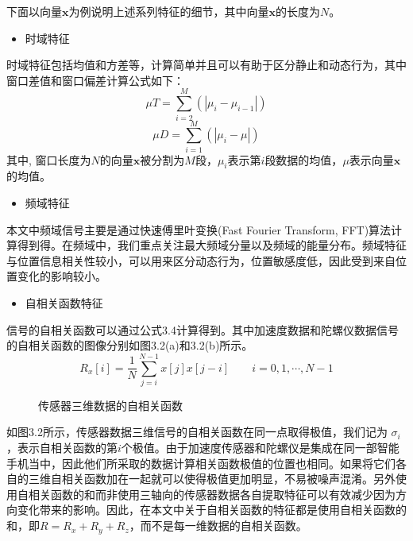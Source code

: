 下面以向量$\textbf{x}$为例说明上述系列特征的细节，其中向量$\textbf{x}$的长度为$N$。
\begin{itemize}
	\item 时域特征
\end{itemize}
\par 时域特征包括均值和方差等，计算简单并且可以有助于区分静止和动态行为，其中窗口差值和窗口偏差计算公式如下：
\begin{equation}
	\mu T = \sum_{i=2}^{M}(|\mu_i - \mu_{i-1}|)
\end{equation}
\begin{equation}
	\mu D = \sum_{i=1}^{M}(|\mu_i - \mu|)
\end{equation}
其中, 窗口长度为$N$的向量$\textbf{x}$被分割为$M$段，$\mu_i$表示第$i$段数据的均值，$\mu$表示向量$\textbf{x}$的均值。
\begin{itemize}
	\item 频域特征
\end{itemize}
\par 本文中频域信号主要是通过快速傅里叶变换(Fast Fourier Transform, FFT)算法计算得到得。在频域中，我们重点关注最大频域分量以及频域的能量分布。频域特征与位置信息相关性较小，可以用来区分动态行为，位置敏感度低，因此受到来自位置变化的影响较小。
\begin{itemize}
	\item 自相关函数特征
\end{itemize}
\par 信号的自相关函数可以通过公式3.4计算得到。其中加速度数据和陀螺仪数据信号的自相关函数的图像分别如图3.2(a)和3.2(b)所示。
\begin{equation}
	R_x[i]=\frac{1}{N}\sum_{j=i}^{N-1} x[j]x[j-i]\qquad  i=0, 1, \cdots, N-1
\end{equation}
\begin{figure}[!htb]
    \centering
    \caption{传感器三维数据的自相关函数}
\end{figure}

\par 如图3.2所示，传感器数据三维信号的自相关函数在同一点取得极值，我们记为 $\sigma_i$，表示自相关函数的第$i$个极值。由于加速度传感器和陀螺仪是集成在同一部智能手机当中，因此他们所采取的数据计算相关函数极值的位置也相同。如果将它们各自的三维自相关函数加在一起就可以使得极值更加明显，不易被噪声混淆。另外使用自相关函数的和而非使用三轴向的传感器数据各自提取特征可以有效减少因为方向变化带来的影响。因此，在本文中关于自相关函数的特征都是使用自相关函数的和，即$R = R_x + R_y + R_z$，而不是每一维数据的自相关函数。


